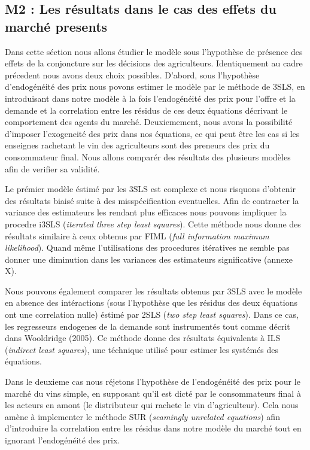 \documentclass[11pt,]{article}
\begin{document}
\hypertarget{m2-les-resultats-dans-le-cas-des-effets-du-marche-presents}{%
\subsection{M2 : Les résultats dans le cas des effets du marché
presents}\label{m2-les-resultats-dans-le-cas-des-effets-du-marche-presents}}

Dans cette séction nous allons étudier le modèle sous l'hypothèse de
présence des effets de la conjoncture sur les décisions des
agriculteurs. Identiquement au cadre précedent nous avons deux choix
possibles. D'abord, sous l'hypothèse d'endogénéité des prix nous povons
estimer le modèle par le méthode de 3SLS, en introduisant dans notre
modèle à la fois l'endogénéité des prix pour l'offre et la demande et la
correlation entre les résidus de ces deux équations décrivant le
comportement des agents du marché. Deuxiemement, nous avons la
possibilité d'imposer l'exogeneité des prix dans nos équations, ce qui
peut être les cas si les enseignes rachetant le vin des agriculteurs
sont des preneurs des prix du consommateur final. Nous allons comparér
des résultats des plusieurs modèles afin de verifier sa validité.

Le prémier modèle éstimé par les 3SLS est complexe et nous risquons
d'obtenir des résultats biaisé suite à des misspécification eventuelles.
Afin de contracter la variance des estimateurs les rendant plus
efficaces nous pouvons impliquer la procedre i3SLS (\emph{iterated three
step least squares}). Cette méthode nous donne des résultats similaire à
ceux obtenus par FIML (\emph{full information maximum likelihood}).
Quand même l'utilisations des procedures itératives ne semble pas donner
une diminution dans les variances des estimateurs significative (annexe
X).

Nous pouvons également comparer les résultats obtenus par 3SLS avec le
modèle en absence des intéractions (sous l'hypothèse que les résidus des
deux équations ont une correlation nulle) éstimé par 2SLS (\emph{two
step least squares}). Dans ce cas, les regresseurs endogenes de la
demande sont instrumentés tout comme décrit dans Wooldridge (2005). Ce
méthode donne des résultats équivalents à ILS (\emph{indirect least
squares}), une téchnique utilisé pour estimer les systémés des
équations.

Dans le deuxieme cas nous réjetons l'hypothèse de l'endogénéité des prix
pour le marché du vins simple, en supposant qu'il est dicté par le
consommateurs final à les acteurs en amont (le distributeur qui rachete
le vin d'agriculteur). Cela nous amène à implementer le méthode SUR
(\emph{seamingly unrelated equations}) afin d'introduire la correlation
entre les résidus dans notre modèle du marché tout en ignorant
l'endogénéité des prix.
\end{document}
